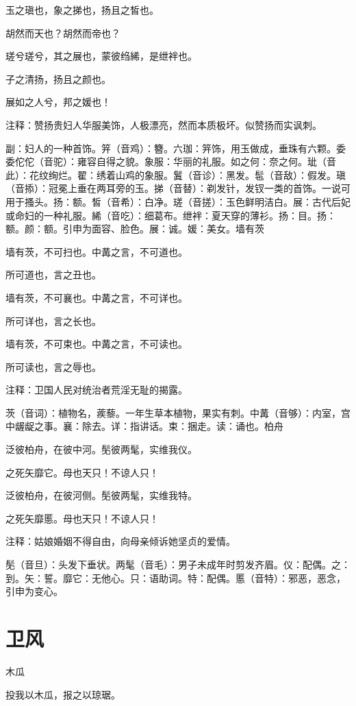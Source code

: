 \documentclass[12pt,UTF8]{ctexbook}
\begin{document}
玉之瑱也，象之挮也，扬且之皙也。

胡然而天也？胡然而帝也？

瑳兮瑳兮，其之展也，蒙彼绉絺，是绁袢也。

子之清扬，扬且之颜也。

展如之人兮，邦之媛也！

注释：赞扬贵妇人华服美饰，人极漂亮，然而本质极坏。似赞扬而实讽刺。

副：妇人的一种首饰。笄（音鸡）：簪。六珈：笄饰，用玉做成，垂珠有六颗。委委佗佗（音驼）：雍容自得之貌。象服：华丽的礼服。如之何：奈之何。玼（音此）：花纹绚烂。翟：绣着山鸡的象服。鬒（音诊）：黑发。髢（音敌）：假发。瑱（音掭）：冠冕上垂在两耳旁的玉。挮（音替）：剃发针，发钗一类的首饰。一说可用于搔头。扬：额。皙（音希）：白净。瑳（音搓）：玉色鲜明洁白。展：古代后妃或命妇的一种礼服。絺（音吃）：细葛布。绁袢：夏天穿的薄衫。扬：目。扬：额。颜：额。引申为面容、脸色。展：诚。媛：美女。墙有茨

墙有茨，不可扫也。中冓之言，不可道也。

所可道也，言之丑也。

墙有茨，不可襄也。中冓之言，不可详也。

所可详也，言之长也。

墙有茨，不可束也。中冓之言，不可读也。

所可读也，言之辱也。

注释：卫国人民对统治者荒淫无耻的揭露。

茨（音词）：植物名，蒺藜。一年生草本植物，果实有刺。中冓（音够）：内室，宫中龌龊之事。襄：除去。详：指讲话。束：捆走。读：诵也。柏舟

泛彼柏舟，在彼中河。髧彼两髦，实维我仪。

之死矢靡它。母也天只！不谅人只！

泛彼柏舟，在彼河侧。髧彼两髦，实维我特。

之死矢靡慝。母也天只！不谅人只！

注释：姑娘婚姻不得自由，向母亲倾诉她坚贞的爱情。

髧（音旦）：头发下垂状。两髦（音毛）：男子未成年时剪发齐眉。仪：配偶。之：到。矢：誓。靡它：无他心。只：语助词。特：配偶。慝（音特）：邪恶，恶念，引申为变心。



\part{卫风}

木瓜

投我以木瓜，报之以琼琚。
\end{document}
